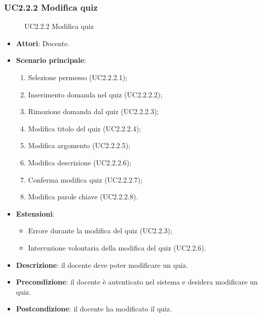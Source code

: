 \subsubsection{UC2.2.2 Modifica quiz}
\begin{figure}[H]
\centering
\noindent{}
\caption{UC2.2.2 Modifica quiz}
\end{figure}
\begin{itemize}
\item \textbf{Attori}: Docente.
\item \textbf{Scenario principale}:
\begin{enumerate}
\item Selezione permesso (UC2.2.2.1);
\item Inserimento domanda nel quiz (UC2.2.2.2);
\item Rimozione domanda dal quiz (UC2.2.2.3);
\item Modifica titolo del quiz (UC2.2.2.4);
\item Modifica argomento (UC2.2.2.5);
\item Modifica descrizione (UC2.2.2.6);
\item Conferma modifica quiz (UC2.2.2.7);
\item Modifica parole chiave (UC2.2.2.8).
\end{enumerate}
\item \textbf{Estensioni}:
\begin{itemize}
\item Errore durante la modifica del quiz (UC2.2.3);
\item Interruzione volontaria della modifica del quiz (UC2.2.6).
\end{itemize}
\item \textbf{Descrizione}: il docente deve poter modificare un quiz.
\item \textbf{Precondizione}: il docente è autenticato nel sistema e desidera modificare un quiz.
\item \textbf{Postcondizione}: il docente ha modificato il quiz.
\end{itemize}
